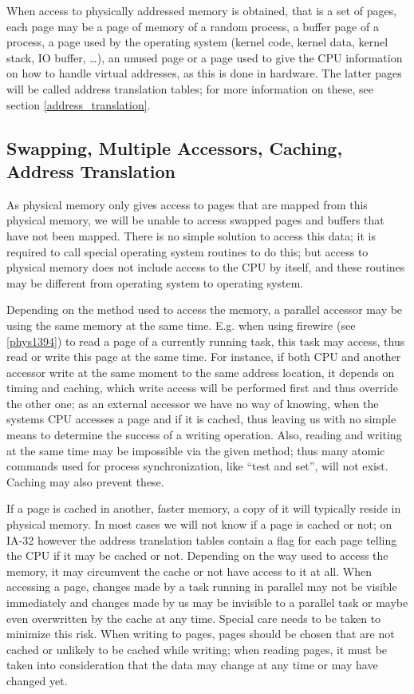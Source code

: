 When access to physically addressed memory is obtained, that is a set of pages,
each page may be a page of memory of a random process, a buffer page of a
process, a page used by the operating system (kernel code, kernel data, kernel
stack, IO buffer, \dots), an unused page or a page used to give the CPU
information on how to handle virtual addresses, as this is done in hardware.
The latter pages will be called address translation tables; for more information
on these, see section \ref{address_translation}.

\subsection{Swapping, Multiple Accessors, Caching, Address Translation}


As physical memory only gives access to pages that are mapped from this
physical memory, we will be unable to access swapped pages and buffers that
have not been mapped. There is no simple solution to access this data; it is
required to call special operating system routines to do this; but access to
physical memory does not include access to the CPU by itself, and these routines
may be different from operating system to operating system.

Depending on the method used to access the memory, a parallel accessor may be
using the same memory at the same time. E.g\@. when using firewire (see
\ref{phys1394}) to read a page of a currently running task, this task may
access, thus read or write this page at the same time. For instance, if both CPU
and another accessor write at the same moment to the same address location, it
depends on timing and caching, which write access will be performed first and
thus override the other one; as an external accessor we have no way of knowing,
when the systems CPU accesses a page and if it is cached, thus leaving us with
no simple means to determine the success of a writing operation.  Also, reading
and writing at the same time may be impossible via the given method; thus many
atomic commands used for process synchronization, like ``test and set'', will
not exist.  Caching may also prevent these.

If a page is cached in another, faster memory, a copy of it will typically
reside in physical memory. In most cases we will not know if a page is cached or
not; on IA-32 however the address translation tables contain a flag for each
page telling the CPU if it may be cached or not. Depending on the way used to
access the memory, it may circumvent the cache or not have access to it at all.
When accessing a page, changes made by a task running in parallel may not be
visible immediately and changes made by us may be invisible to a parallel task
or maybe even overwritten by the cache at any time. Special care needs to be
taken to minimize this risk. When writing to pages, pages should be chosen that
are not cached or unlikely to be cached while writing; when reading pages, it
must be taken into consideration that the data may change at any time or may
have changed yet.

